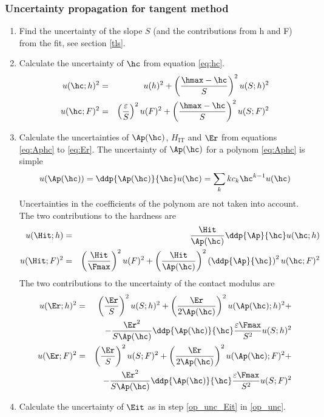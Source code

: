 \subsubsection{Uncertainty propagation for tangent method}\label{tg_unc}


\begin{enumerate}
 \item 
 Find the uncertainty of the slope $S$ (and the contributions from h and F) from the fit, see section \ref{tls}.
 \item \label{tg_unc_hc}
  Calculate the uncertainty of $\hc$  from equation \eqref{eq:hc}.\\
 \begin{eqnarray}
 u(\hc;h)^2 &=&  u(h)^2 + \left( \frac{\hmax - \hc}{S}\right)^2 u(S;h)^2 \\
 u(\hc;F)^2 &=&  \left( \frac{\varepsilon}{S}\right)^2 u(F)^2 + \left( \frac{\hmax - \hc}{S}\right)^2 u(S;F)^2
 \end{eqnarray}

\item \label{tg_unc_H_E}
 Calculate the uncertainties of $\Ap(\hc)$, $H_{\mathrm{IT}}$ and $\Er$ from equations \eqref{eq:Aphc} to \eqref{eq:Er}.
 The uncertainty of $\Ap(\hc)$ for a polynom \eqref{eq:Aphc} is simple
 \begin{equation}
  u(\Ap(\hc)) = \ddp{ \Ap(\hc)}{\hc} u(\hc) =  \sum_{k} k c_k \hc^{k-1} u(\hc)
 \end{equation}
Uncertainties in the coefficients of the polynom are not taken into account. \\
The two contributions to the hardness are
 \begin{eqnarray} 
u(\Hit;h)&=&    \frac{\Hit}{\Ap(\hc)} \ddp{ \Ap}{\hc} u(\hc;h) \\
u(\Hit;F)^2 &=& 
 \left( \frac{\Hit}{ \Fmax}\right)^2 u(F)^2 + 
 \left( \frac{\Hit}{\Ap(\hc)} \right)^2 \left(\ddp{ \Ap}{\hc}  \right)^2 u(\hc;F)^2 \nonumber \\
\end{eqnarray}
The two contributions to the uncertainty of the contact modulus are
\begin{eqnarray}
  u(\Er;h)^2 &=& 
  \left( \frac{ \Er}{ S}\right)^2 u(S;h)^2 + 
 \left( \frac{ \Er}{ 2\Ap(\hc)} \right)^2 u(\Ap(\hc);h)^2 + \nonumber \\ 
  && -  \frac{ \Er^2}{ S \Ap(\hc)} \ddp{\Ap(\hc)}{\hc} \frac{\varepsilon \Fmax}{S^2} u(S;h)^2 \\
u(\Er;F)^2 &=& 
 \left( \frac{ \Er}{ S}\right)^2 u(S;F)^2 + 
 \left( \frac{ \Er}{ 2\Ap(\hc)} \right)^2 u(\Ap(\hc);F)^2 + \nonumber\\ 
  && -  \frac{ \Er^2}{ S \Ap(\hc)} \ddp{\Ap(\hc)}{\hc} \frac{\varepsilon \Fmax}{S^2} u(S;F)^2   
\end{eqnarray}
\item Calculate the uncertainty of $\Eit$ as in step \ref{op_unc_Eit} in \ref{op_unc}.

\end{enumerate}

